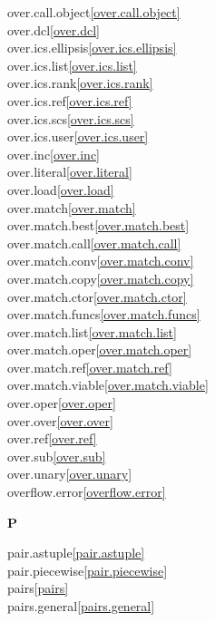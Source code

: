 \begin{multicols}{2}
over.call.object\quad\ref{over.call.object}\\
over.dcl\quad\ref{over.dcl}\\
over.ics.ellipsis\quad\ref{over.ics.ellipsis}\\
over.ics.list\quad\ref{over.ics.list}\\
over.ics.rank\quad\ref{over.ics.rank}\\
over.ics.ref\quad\ref{over.ics.ref}\\
over.ics.scs\quad\ref{over.ics.scs}\\
over.ics.user\quad\ref{over.ics.user}\\
over.inc\quad\ref{over.inc}\\
over.literal\quad\ref{over.literal}\\
over.load\quad\ref{over.load}\\
over.match\quad\ref{over.match}\\
over.match.best\quad\ref{over.match.best}\\
over.match.call\quad\ref{over.match.call}\\
over.match.conv\quad\ref{over.match.conv}\\
over.match.copy\quad\ref{over.match.copy}\\
over.match.ctor\quad\ref{over.match.ctor}\\
over.match.funcs\quad\ref{over.match.funcs}\\
over.match.list\quad\ref{over.match.list}\\
over.match.oper\quad\ref{over.match.oper}\\
over.match.ref\quad\ref{over.match.ref}\\
over.match.viable\quad\ref{over.match.viable}\\
over.oper\quad\ref{over.oper}\\
over.over\quad\ref{over.over}\\
over.ref\quad\ref{over.ref}\\
over.sub\quad\ref{over.sub}\\
over.unary\quad\ref{over.unary}\\
overflow.error\quad\ref{overflow.error}\\
\par \textbf{P}\par
pair.astuple\quad\ref{pair.astuple}\\
pair.piecewise\quad\ref{pair.piecewise}\\
pairs\quad\ref{pairs}\\
pairs.general\quad\ref{pairs.general}\\

\end{multicols}
